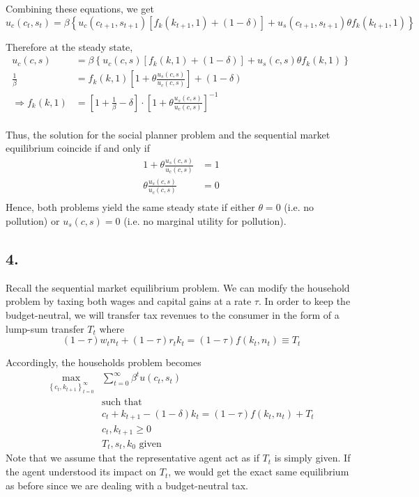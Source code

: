 \documentclass[12pt]{article}
\theoremstyle{definition}
\newcommand\st{\text{such that }}
\newcommand{\cbra}[1]{\left\{#1\right\}}
\begin{document}
Combining these equations, we get
\[
u_c(c_t,s_t)=\beta \left\lbrace u_c(c_{t+1},s_{t+1})\left[f_k(k_{t+1},1) + (1-\delta) \right]   + u_s(c_{t+1},s_{t+1})\theta f_k(k_{t+1},1)\right\rbrace 
\]

Therefore at the steady state,
\begin{align*}
u_c(c,s) & =\beta \left\lbrace u_c(c,s)\left[f_k(k,1) + (1-\delta) \right]   + u_s(c,s)\theta f_k(k,1)\right\rbrace  \\
\frac{1}{\beta} &= f_k(k,1)\left[ 1+\theta\frac{u_s(c,s)}{u_c(c,s)}\right]  + (1-\delta)\\
\Rightarrow f_k(k,1) &= \left[ 1 + \frac{1}{\beta} -\delta\right] 
\cdot \left[ 1+\theta\frac{u_s(c,s)}{u_c(c,s)}\right]^{-1}\\
\end{align*}

Thus, the solution for the social planner problem and the sequential market equilibrium coincide if and only if
\[
\begin{split}
 1+\theta\frac{u_s(c,s)}{u_c(c,s)} & = 1 \\
 \theta\frac{u_s(c,s)}{u_c(c,s)} & = 0 \\
\end{split}
\] 
Hence, both problems yield the same steady state if either $\theta =0$ (i.e. no pollution) or $u_s(c,s) =0$ (i.e. no marginal utility for pollution).

\subsection*{4.}

Recall the sequential market equilibrium problem. We can modify the household problem by taxing both wages and capital gains at a rate $\tau$. In order to keep the budget-neutral, we will transfer tax revenues to the consumer in the form of a lump-sum transfer $T_t$ where
\[
(1-\tau)w_tn_t + (1-\tau)r_tk_t = (1-\tau)f(k_t,n_t)\equiv T_t
\]

Accordingly, the households problem becomes
\begin{align*}
\max_{\cbra{c_t,k_{t+1}}_{t=0}^\infty} &\sum_{t=0}^{\infty}\beta^t u(c_t,s_t)\\
&\st\\
& c_t+k_{t+1}-(1-\delta)k_t = (1-\tau)f(k_t,n_t)+T_t\\
& c_t,k_{t+1}\geq 0\\
& T_t,s_t,k_0 \text{ given}
\end{align*}
Note that we assume that the representative agent act as if $T_t$ is simply given. If the agent understood its impact on $T_t$, we would get the exact same equilibrium as before since we are dealing with a budget-neutral tax.
\end{document}
